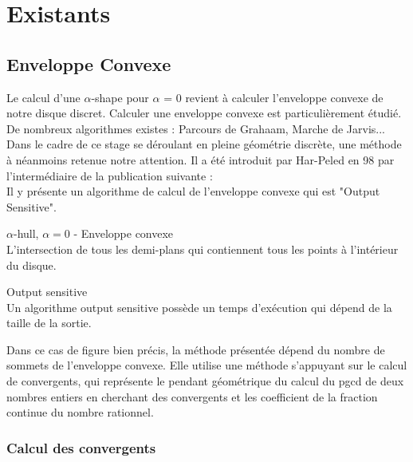 \section{Existants}

\subsection{Enveloppe Convexe}

Le calcul d'une $\alpha$-shape pour $\alpha$ = 0 revient à calculer l'enveloppe convexe de notre disque discret. Calculer une enveloppe convexe est particulièrement étudié. De nombreux algorithmes existes : Parcours de Grahaam, Marche de Jarvis... Dans le cadre de ce stage se déroulant en pleine géométrie discrète, une méthode à néanmoins retenue notre attention. Il a été introduit par Har-Peled en 98 par l'intermédiaire de la publication suivante : \\

Il y présente un algorithme de calcul de l'enveloppe convexe qui est "Output Sensitive".

\begin{Definition}{$\alpha$-hull, $\alpha = 0$ - Enveloppe convexe}\\
\label{def:ch}
      L'intersection de tous les demi-plans qui contiennent tous les points à l’intérieur du disque.
\end{Definition}

\begin{Definition}{Output sensitive}\\
\label{def:os}
      Un algorithme output sensitive possède un temps d’exécution qui dépend de la taille de la sortie.
\end{Definition}

Dans ce cas de figure bien précis, la méthode présentée dépend du nombre de sommets de l'enveloppe convexe. Elle utilise une méthode s'appuyant sur le calcul de convergents, qui représente le pendant géométrique du calcul du pgcd de deux nombres entiers en cherchant des convergents et les coefficient de la fraction continue du nombre rationnel.

\subsubsection{Calcul des convergents}

